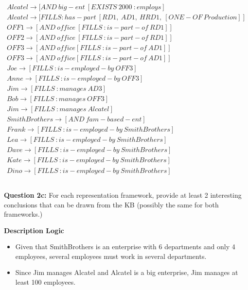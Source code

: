 \documentclass[11pt]{article}
\begin{document}
\begin{align*}
Alcatel \rightarrow [AND\ big-ent\ [EXISTS\ 2000\ :employs] \\
Alcatel \rightarrow [FILLS :has-part\ [RD1,\ AD1,\ HRD1,\ [ONE-OF\ Production]] \\ 
OFF1 \rightarrow [AND\ office\ [FILLS\ :is-part-of\ RD1]] \\
OFF2 \rightarrow [AND \ office\ [FILLS\ :is-part-of\ RD1]] \\
OFF3 \rightarrow [AND\ office [FILLS\ :is-part-of\ AD1]] \\
OFF3 \rightarrow [AND\ office [FILLS\ :is-part-of\ AD1]] \\
Joe \rightarrow [FILLS\ :is-employed-by\ OFF3] \\
Anne \rightarrow [FILLS\ :is-employed-by\ OFF3] \\
Jim \rightarrow [FILLS\ :manages\ AD3] \\ 
Bob \rightarrow [FILLS\ :manages\ OFF3] \\
Jim \rightarrow [FILLS\ :manages\ Alcatel] \\ 
SmithBrothers \rightarrow [AND\ fam-based-ent] \\
Frank \rightarrow [FILLS\ :is-employed-by\ SmithBrothers] \\ 
Lea \rightarrow [FILLS\ :is-employed-by\ SmithBrothers] \\ 
Dave \rightarrow [FILLS\ :is-employed-by\ SmithBrothers] \\ 
Kate \rightarrow [FILLS\ :is-employed-by\ SmithBrothers] \\ 
Dino \rightarrow [FILLS\ :is-employed-by\ SmithBrothers] 
\end{align*}

\subsection{}
\textbf{Question 2c:}
For each representation framework, provide at least 2 interesting conclusions that can be drawn from the KB (possibly the same for both frameworks.)

\textbf{Description Logic}
\begin{itemize}
\item Given that SmithBrothers is an enterprise with 6 departments and only 4 employees, several employees must work in several departments.
\item Since Jim manages Alcatel and Alcatel is a big enterprise, Jim manages at least 100 employees. 
    \end{itemize}
\end{document}
